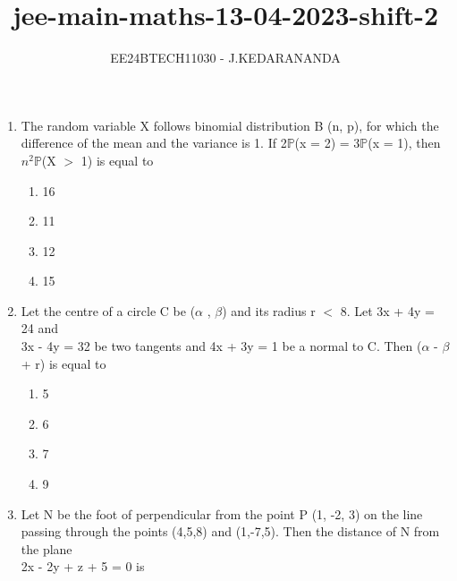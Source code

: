 \documentclass[journal]{IEEEtran}
\renewcommand{\thefigure}{\theenumi}
\renewcommand{\thetable}{\theenumi}
\numberwithin{equation}{enumi}
\numberwithin{figure}{enumi}
\renewcommand{\thetable}{\theenumi}
\begin{document}

\vspace{3cm}

\title{jee-main-maths-13-04-2023-shift-2}
\author{EE24BTECH11030 - J.KEDARANANDA}
{\let\newpage\relax\maketitle}
\renewcommand{\thefigure}{\theenumi}
\renewcommand{\thetable}{\theenumi}
\begin{enumerate}
    \item The random variable X follows binomial distribution B (n, p), for which the difference of the mean and the variance is 1. If 2$\mathbb{P}$(x = 2) = 3$\mathbb{P}$(x = 1), then \\$n^2\mathbb{P}$(X $>$ 1) is equal to  \\ 
    \begin{multicols}{4}
    \begin{enumerate}
        \item 16
        \item 11
        \item 12
        \item 15
    \end{enumerate}
    \end{multicols}
    \bigskip
    \item Let the centre of a circle C be ($\alpha$ , $\beta$) and its radius r $<$ 8. Let 3x + 4y = 24 and\\ 3x - 4y = 32 be two tangents and 4x + 3y = 1 be a normal to C. Then ($\alpha$ - $\beta$ + r) is equal to  \\
    \begin{multicols}{4}
    \begin{enumerate}
        \item 5
        \item 6
        \item 7
        \item 9
    \end{enumerate} 
    \end{multicols}
    \bigskip
    \item Let N be the foot of perpendicular from the point P (1, -2, 3) on the line passing through the points (4,5,8) and (1,-7,5). Then the distance of N from the plane\\ 2x - 2y + z + 5 = 0 is  \\

\end{enumerate}
\end{document}
